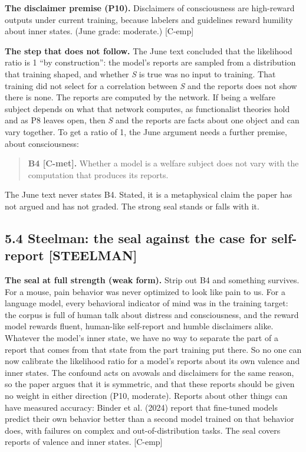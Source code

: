 \documentclass[11pt]{article}
\newcommand{\register}[1]{{\ttfamily\small #1}}
\begin{document}
\textbf{The disclaimer premise (P10).} Disclaimers of consciousness are high-reward outputs under current training, because labelers and guidelines reward humility about inner states. (June grade: moderate.) [C-emp]

\textbf{The step that does not follow.} The June text concluded that the likelihood ratio is 1 ``by construction'': the model's reports are sampled from a distribution that training shaped, and whether \emph{S} is true was no input to training. That training did not select for a correlation between \emph{S} and the reports does not show there is none. The reports are computed by the network. If being a welfare subject depends on what that network computes, as functionalist theories hold and as P8 leaves open, then \emph{S} and the reports are facts about one object and can vary together. To get a ratio of 1, the June argument needs a further premise, about consciousness:

\begin{quote}
\textbf{B4 [C-met].} Whether a model is a welfare subject does not vary with the computation that produces its reports.
\end{quote}

The June text never states B4. Stated, it is a metaphysical claim the paper has not argued and has not graded. The strong seal stands or falls with it.

\subsection*{5.4 Steelman: the seal against the case for self-report \register{[STEELMAN]}}

\textbf{The seal at full strength (weak form).} Strip out B4 and something survives. For a mouse, pain behavior was never optimized to look like pain to us. For a language model, every behavioral indicator of mind was in the training target: the corpus is full of human talk about distress and consciousness, and the reward model rewards fluent, human-like self-report and humble disclaimers alike. Whatever the model's inner state, we have no way to separate the part of a report that comes from that state from the part training put there. So no one can now calibrate the likelihood ratio for a model's reports about its own valence and inner states. The confound acts on avowals and disclaimers for the same reason, so the paper argues that it is symmetric, and that these reports should be given no weight in either direction (P10, moderate). Reports about other things can have measured accuracy: Binder et al. (2024) report that fine-tuned models predict their own behavior better than a second model trained on that behavior does, with failures on complex and out-of-distribution tasks. The seal covers reports of valence and inner states. [C-emp]
\end{document}
